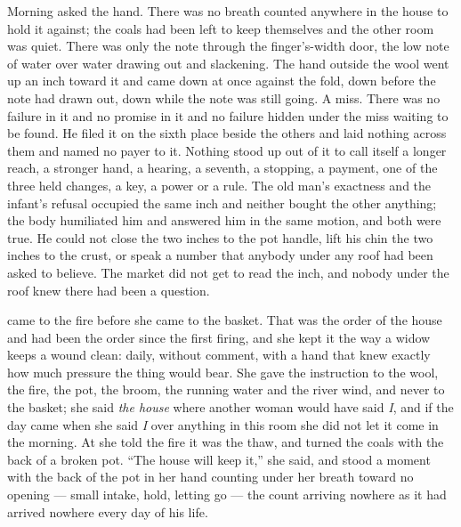 \scenebreak

Morning asked the hand. There was no breath counted anywhere in the house to hold it against; the coals had been left to keep themselves and the other room was quiet. There was only the note through the finger's-width door, the low note of water over water drawing out and slackening. The hand outside the wool went up an inch toward it and came down at once against the fold, down before the note had drawn out, down while the note was still going. A miss. There was no failure in it and no promise in it and no failure hidden under the miss waiting to be found. He filed it on the sixth place beside the others and laid nothing across them and named no payer to it. Nothing stood up out of it to call itself a longer reach, a stronger hand, a hearing, a seventh, a stopping, a payment, one of the three held changes, a key, a power or a rule. The old man's exactness and the infant's refusal occupied the same inch and neither bought the other anything; the body humiliated him and answered him in the same motion, and both were true. He could not close the two inches to the pot handle, lift his chin the two inches to the crust, or speak a number that anybody under any roof had been asked to believe. The market did not get to read the inch, and nobody under the roof knew there had been a question.

\scenebreak

 came to the fire before she came to the basket. That was the order of the house and had been the order since the first firing, and she kept it the way a widow keeps a wound clean: daily, without comment, with a hand that knew exactly how much pressure the thing would bear. She gave the instruction to the wool, the fire, the pot, the broom, the running water and the river wind, and never to the basket; she said \emph{the house} where another woman would have said \emph{I}, and if the day came when she said \emph{I} over anything in this room she did not let it come in the morning. At  she told the fire it was the thaw, and turned the coals with the back of a broken pot. “The house will keep it,” she said, and stood a moment with the back of the pot in her hand counting under her breath toward no opening --- small intake, hold, letting go --- the count arriving nowhere as it had arrived nowhere every day of his life.


